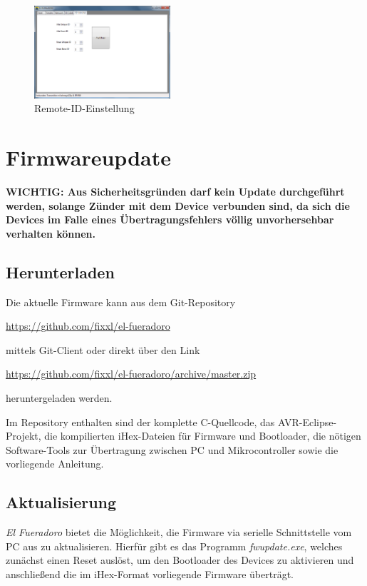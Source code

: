 \documentclass[pdftex, parskip, numbers=noenddot, toc=listof]{scrbook}
\newcommand{\anlage}{\emph{El Fueradoro}}
\begin{document}
	\begin{figure}[!t]
		\centering
		\includegraphics[width=0.45\textwidth]{bilder/gui-remote}
		\caption{Remote-ID-Einstellung}
		\label{fig:gui-remote}
	\end{figure}

	\chapter{Firmwareupdate}
	\label{ch:firmwareupdate}

	\textbf{WICHTIG: Aus Sicherheitsgründen darf kein Update durchgeführt werden, solange Zünder mit dem Device verbunden sind, da sich die Devices im Falle eines Übertragungsfehlers völlig unvorhersehbar verhalten können.}

	\section{Herunterladen}

	Die aktuelle Firmware kann aus dem Git-Repository
	\begin{center}\url{https://github.com/fixxl/el-fueradoro}\end{center}
	mittels Git-Client oder direkt über den Link
	\begin{center}\url{https://github.com/fixxl/el-fueradoro/archive/master.zip}\end{center}
	heruntergeladen werden.

	Im Repository enthalten sind der komplette C-Quellcode, das AVR-Eclipse-Projekt, die kom\-pilierten iHex-Dateien für Firmware und Bootloader, die nötigen Software-Tools zur Übertragung zwischen PC und Mikrocontroller sowie die vorliegende Anleitung.

	\section{Aktualisierung}

	{\anlage} bietet die Möglichkeit, die Firmware via serielle Schnittstelle vom PC aus zu aktualisieren. Hierfür gibt es das Programm \emph{fwupdate.exe}, welches zunächst einen Reset auslöst, um den Bootloader des Devices zu aktivieren und anschließend die im iHex-Format vorliegende Firmware überträgt.
\end{document}
